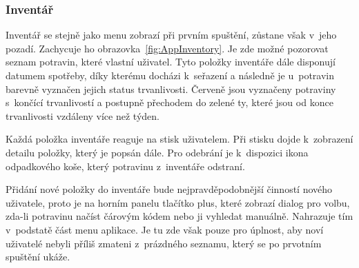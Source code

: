 \documentclass[thesis=B,czech]{FITthesis}[2013/10/20]
\begin{document}
\clearpage

\subsubsection{Inventář}

Inventář se stejně jako menu zobrazí při prvním spuštění, zůstane však v~jeho pozadí. Zachycuje ho obrazovka~\ref{fig:AppInventory}. Je zde možné pozorovat seznam potravin, které vlastní uživatel. Tyto položky inventáře dále disponují datumem spotřeby, díky kterému docházi k~seřazení a následně je u~potravin barevně vyznačen jejich status trvanlivosti. Červeně jsou vyznačeny potraviny s~končící trvanlivostí a postupně přechodem do zelené ty, které jsou od konce trvanlivosti vzdáleny více než týden.

Každá položka inventáře reaguje na stisk uživatelem. Při stisku dojde k~zobrazení detailu položky, který je popsán dále. Pro odebrání je k~dispozici ikona odpadkového koše, který potravinu z~inventáře odstraní.

Přidání nové položky do inventáře bude nejpravděpodobnější činností nového uživatele, proto je na horním panelu tlačítko plus, které zobrazí dialog pro volbu, zda-li potravinu načíst čárovým kódem nebo ji vyhledat manuálně. Nahrazuje tím v~podstatě část menu aplikace. Je tu zde však pouze pro úplnost, aby noví uživatelé nebyli příliš zmateni z~prázdného seznamu, který se po prvotním spuštění ukáže.
\end{document}
